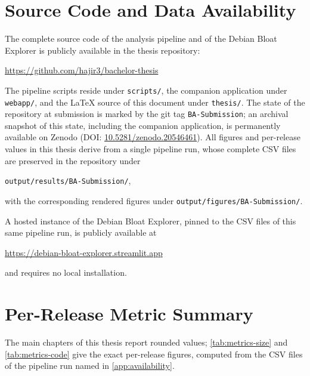 \section{Source Code and Data Availability}
\label{app:availability}

The complete source code of the analysis pipeline and of the Debian Bloat Explorer is publicly available in the thesis repository:
\begin{center}
  \url{https://github.com/hajir3/bachelor-thesis}
\end{center}
The pipeline scripts reside under \texttt{scripts/}, the companion application under \texttt{webapp/}, and the \LaTeX{} source of this document under \texttt{thesis/}. The state of the repository at submission is marked by the git tag \texttt{BA-Submission}; an archival snapshot of this state, including the companion application, is permanently available on Zenodo (DOI: \href{https://doi.org/10.5281/zenodo.20546461}{10.5281/zenodo.20546461}). All figures and per-release values in this thesis derive from a single pipeline run, whose complete CSV files are preserved in the repository under
\begin{center}
  \texttt{output/results/BA-Submission/},
\end{center}
with the corresponding rendered figures under \texttt{output/figures/BA-Submission/}.

A hosted instance of the Debian Bloat Explorer, pinned to the CSV files of this same pipeline run, is publicly available at
\begin{center}
  \url{https://debian-bloat-explorer.streamlit.app}
\end{center}
and requires no local installation.

\clearpage
\section{Per-Release Metric Summary}
\label{app:metrics}

The main chapters of this thesis report rounded values; \autoref{tab:metrics-size} and \autoref{tab:metrics-code} give the exact per-release figures, computed from the CSV files of the pipeline run named in \autoref{app:availability}.

